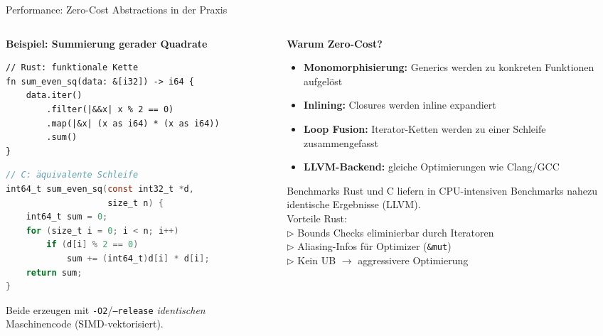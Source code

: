 \documentclass[%
  aspectratio=169,
  10pt
]{beamer}
\begin{document}
\begin{frame}[fragile]{Performance: Zero-Cost Abstractions in der Praxis}
  \begin{columns}[T]
    \begin{column}{0.50\textwidth}
      \textbf{Beispiel: Summierung gerader Quadrate}
\begin{lstlisting}
// Rust: funktionale Kette
fn sum_even_sq(data: &[i32]) -> i64 {
    data.iter()
        .filter(|&&x| x % 2 == 0)
        .map(|&x| (x as i64) * (x as i64))
        .sum()
}
\end{lstlisting}
\begin{lstlisting}[language=C,morekeywords={int64_t,int32_t,size_t}]
// C: äquivalente Schleife
int64_t sum_even_sq(const int32_t *d,
                    size_t n) {
    int64_t sum = 0;
    for (size_t i = 0; i < n; i++)
        if (d[i] % 2 == 0)
            sum += (int64_t)d[i] * d[i];
    return sum;
}
\end{lstlisting}
      \begin{block}{}
        \small Beide erzeugen mit \texttt{-O2}/\texttt{--release}
        \emph{identischen} Maschinencode (SIMD-vektorisiert).
      \end{block}
    \end{column}
    \begin{column}{0.47\textwidth}
      \textbf{Warum Zero-Cost?}
      \small
      \begin{itemize}
        \item \textbf{Monomorphisierung:} Generics werden
              zu konkreten Funktionen aufgelöst
        \item \textbf{Inlining:} Closures werden inline expandiert
        \item \textbf{Loop Fusion:} Iterator-Ketten werden
              zu einer Schleife zusammengefasst
        \item \textbf{LLVM-Backend:} gleiche Optimierungen
              wie Clang/GCC
      \end{itemize}
      \begin{exampleblock}{Benchmarks}
        \small Rust und C liefern in CPU-intensiven Benchmarks
        nahezu identische Ergebnisse (LLVM).\\[0.2em]
        Vorteile Rust:\\
        $\triangleright$ Bounds Checks eliminierbar durch Iteratoren\\
        $\triangleright$ Aliasing-Infos für Optimizer (\texttt{\&mut})\\
        $\triangleright$ Kein UB $\to$ aggressivere Optimierung
      \end{exampleblock}
    \end{column}
  \end{columns}
\end{frame}
\end{document}

